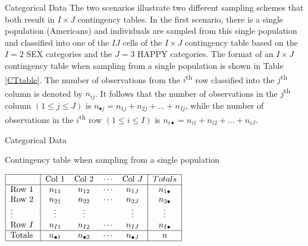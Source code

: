 \documentclass[
  ignorenonframetext,
]{beamer}
\begin{document}
\begin{frame}{Categorical Data}
\protect\hypertarget{categorical-data-1}{}
The two scenarios illustrate two different sampling schemes that both
result in \(I \times J\) contingency tables. In the first scenario,
there is a single population (Americans) and individuals are sampled
from this single population and classified into one of the \(IJ\) cells
of the \(I\times J\) contingency table based on the \(I=2\) SEX
categories and the \(J=3\) HAPPY categories. The format of an
\(I \times J\) contingency table when sampling from a single population
is shown in Table \ref{CTtable}. The number of observations from the
\(i\)\textsuperscript{th} row classified into the
\(j\)\textsuperscript{th} column is denoted by \(n_{ij}\). It follows
that the number of observations in the \(j\)\textsuperscript{th} column
\((1 \le j \le J)\) is \(n_{\bullet j}=n_{1j}+n_{2j}+\dots+n_{Ij}\),
while the number of observations in the \(i\)\textsuperscript{th} row
\((1 \le i \le I)\) is \(n_{i\bullet}=n_{i1}+n_{i2}+\dots+n_{iJ}\).
\end{frame}

\begin{frame}{Categorical Data}
\protect\hypertarget{categorical-data-2}{}
\begin{table}[!ht]
\caption{Contingency table when sampling from a single population\label{CTtable}}
\medskip
\centerline{$\setlength{\arraycolsep}{2mm}
\begin{array}{|l|*{4}{c}|c|}
\hline
&    \text{Col } 1 &  \text{Col }2&   \cdots &  \text{Col }J&   Totals\\
\hline
\text{Row }1  & n_{11} & n_{12}  &\cdots&        n_{1J} & n_{1\bullet}\\
\text{Row }2  & n_{21} & n_{22}  &\cdots&        n_{2J} & n_{2\bullet}\\
\vdots &       \vdots &  \vdots &     &          \vdots &\vdots\\
\text{Row }I  & n_{I1} & n_{I2} &\cdots&         n_{IJ} & n_{I\bullet}\\ \hline
\text{Totals }& n_{\bullet 1}  & n_{\bullet 2}  &\cdots&         n_{\bullet J}  & n\\
\hline
\end{array}$\setlength{\arraycolsep}{1.5pt}}
\end{table}
\end{frame}
\end{document}
